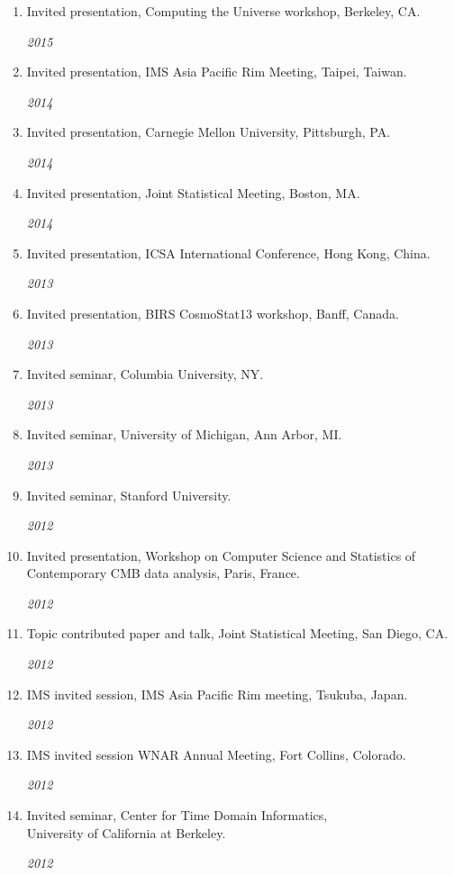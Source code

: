\documentclass[11pt]{article}
\newcommand{\ddatedentry}[2]{
  {#1}
  \hfill
  \begin{minipage}{.5in}{\hfill\textit{#2}}\end{minipage}
  }
\begin{document}
\begin{enumerate}

\item
\ddatedentry{Invited presentation, Computing the Universe workshop, Berkeley, CA.}{2015}

\item
\ddatedentry{Invited presentation, IMS Asia Pacific Rim Meeting, Taipei, Taiwan.}{2014}


\item
\ddatedentry{Invited presentation,  Carnegie Mellon University, Pittsburgh, PA.}{2014}


\item
\ddatedentry{Invited presentation,  Joint Statistical Meeting, Boston, MA.}{2014}


\item
\ddatedentry{Invited presentation, ICSA International Conference, Hong Kong, China.}{2013}

\item
\ddatedentry{Invited presentation, BIRS CosmoStat13 workshop, Banff, Canada.}{2013}

\item
\ddatedentry{Invited seminar, Columbia University,  NY.}{2013}


\item
\ddatedentry{Invited seminar, University of Michigan, Ann Arbor, MI.}{2013}


\item
\ddatedentry{Invited seminar, Stanford University.}{2012}


\item
\ddatedentry{Invited presentation, Workshop on Computer Science and
Statistics of \\Contemporary CMB data analysis, Paris, France.}{2012}

\item
\ddatedentry{Topic contributed paper and talk, Joint Statistical Meeting, San Diego, CA.}{2012}

\item
\ddatedentry{IMS invited session, IMS Asia Pacific Rim meeting, Tsukuba, Japan.}{2012}


\item
\ddatedentry{IMS invited session WNAR Annual Meeting, Fort Collins, Colorado.}{2012}

\item
\ddatedentry{Invited seminar, Center for Time Domain Informatics, \\ University of California at Berkeley.}{2012}


\end{enumerate}
\end{document}
